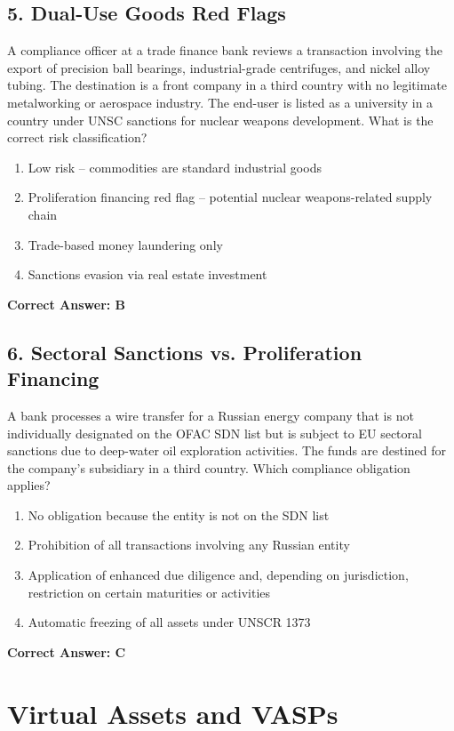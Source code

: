 \documentclass[11pt,a4paper]{article}
\begin{document}
	\subsection{5. Dual-Use Goods Red Flags}
	A compliance officer at a trade finance bank reviews a transaction involving the export of precision ball bearings, industrial-grade centrifuges, and nickel alloy tubing. The destination is a front company in a third country with no legitimate metalworking or aerospace industry. The end-user is listed as a university in a country under UNSC sanctions for nuclear weapons development. What is the correct risk classification?
	\begin{enumerate}[label=\Alph*.]
		\item Low risk – commodities are standard industrial goods
		\item Proliferation financing red flag – potential nuclear weapons-related supply chain
		\item Trade-based money laundering only
		\item Sanctions evasion via real estate investment
	\end{enumerate}
	\textbf{Correct Answer: B}
	
	\subsection{6. Sectoral Sanctions vs. Proliferation Financing}
	A bank processes a wire transfer for a Russian energy company that is not individually designated on the OFAC SDN list but is subject to EU sectoral sanctions due to deep-water oil exploration activities. The funds are destined for the company’s subsidiary in a third country. Which compliance obligation applies?
	\begin{enumerate}[label=\Alph*.]
		\item No obligation because the entity is not on the SDN list
		\item Prohibition of all transactions involving any Russian entity
		\item Application of enhanced due diligence and, depending on jurisdiction, restriction on certain maturities or activities
		\item Automatic freezing of all assets under UNSCR 1373
	\end{enumerate}
	\textbf{Correct Answer: C}
	
	\section{Virtual Assets and VASPs}
	
\end{document}
